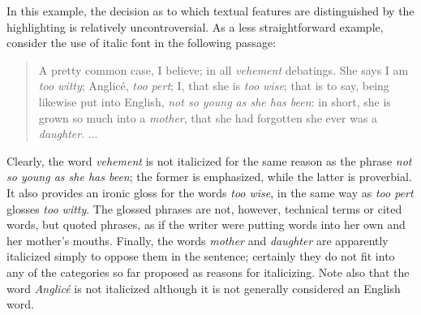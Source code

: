 In this example, the decision as to which textual features are distinguished by the highlighting is relatively uncontroversial. As a less straightforward example, consider the use of italic font in the following passage: 
\begin{quote}A pretty common case, I believe; in all {\itshape vehement} debatings. She says I am {\itshape too witty}; Anglicé, {\itshape too pert}; I, that she is {\itshape too wise}; that is to say, being likewise put into English, {\itshape not so young as she has been}: in short, she is grown so much into a {\itshape mother}, that she had forgotten she ever was a {\itshape daughter}. ...\end{quote}
\par
Clearly, the word \textit{vehement} is not italicized for the same reason as the phrase \textit{not so young as she has been}; the former is emphasized, while the latter is proverbial. It also provides an ironic gloss for the words \textit{too wise}, in the same way as \textit{too pert} glosses \textit{too witty}. The glossed phrases are not, however, technical terms or cited words, but quoted phrases, as if the writer were putting words into her own and her mother's mouths. Finally, the words \textit{mother} and \textit{daughter} are apparently italicized simply to oppose them in the sentence; certainly they do not fit into any of the categories so far proposed as reasons for italicizing. Note also that the word \textit{Anglicé} is not italicized although it is not generally considered an English word.\par
